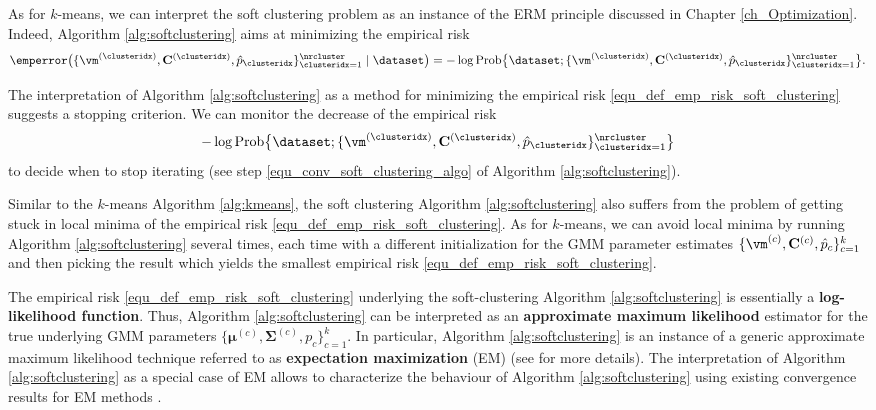 \documentclass[12pt]{report}
\begin{document}
As for $k$-means, we can interpret the soft clustering problem 
as an instance of the ERM principle discussed in Chapter \ref{ch_Optimization}. 
Indeed, Algorithm \ref{alg:softclustering} aims at minimizing the 
empirical risk 
\begin{equation} 
\label{equ_def_emp_risk_soft_clustering}
\emperror \big( \{ \vm^{(\clusteridx)}, \mathbf{C}^{(\clusteridx)}, \hat{p}_{\clusteridx} \}_{\clusteridx=1}^{\nrcluster} \mid \dataset \big)=
 - \log {\rm Prob} \big\{\dataset; \{ \vm^{(\clusteridx)}, \mathbf{C}^{(\clusteridx)}, \hat{p}_{\clusteridx} \}_{\clusteridx=1}^{\nrcluster}\big\}. 
\end{equation} 

The interpretation of Algorithm \ref{alg:softclustering} as a 
method for minimizing the empirical risk \eqref{equ_def_emp_risk_soft_clustering} 
suggests a stopping criterion. We can monitor the decrease of the empirical risk 
$$ - \log {\rm Prob} \big\{\dataset; \{ \vm^{(\clusteridx)}, \mathbf{C}^{(\clusteridx)}, \hat{p}_{\clusteridx} \}_{\clusteridx=1}^{\nrcluster}\big\}$$
to decide when to stop iterating (see step \ref{equ_conv_soft_clustering_algo} 
of Algorithm \ref{alg:softclustering}). %

Similar to the $k$-means Algorithm \ref{alg:kmeans}, the soft clustering Algorithm \ref{alg:softclustering} 
also suffers from the problem of getting stuck in local minima of the empirical risk \eqref{equ_def_emp_risk_soft_clustering}. 
As for $k$-means, we can avoid local minima by running Algorithm \ref{alg:softclustering} 
several times, each time with a different initialization for the GMM parameter 
estimates $ \{ \vm^{(c)}, \mathbf{C}^{(c)}, \hat{p}_{c} \}_{c=1}^{k}$ and then 
picking the result which yields the smallest empirical risk \eqref{equ_def_emp_risk_soft_clustering}.  

The empirical risk \eqref{equ_def_emp_risk_soft_clustering} underlying the 
soft-clustering Algorithm \ref{alg:softclustering} is essentially a {\bf log-likelihood function}. 
Thus, Algorithm \ref{alg:softclustering} can be interpreted as an {\bf approximate maximum 
likelihood} estimator for the true underlying GMM parameters $\{{\bm \mu}^{(c)},{\bm \Sigma}^{(c)},p_{c}\}_{c=1}^{k}$. 
In particular, Algorithm \ref{alg:softclustering} is an instance of a generic 
approximate maximum likelihood technique referred to as {\bf expectation maximization} 
(EM) (see \cite[Chap. 8.5]{hastie01statisticallearning} for more details). 
The interpretation of Algorithm \ref{alg:softclustering} as a special case of 
EM allows to characterize the behaviour of Algorithm \ref{alg:softclustering} 
using existing convergence results for EM methods \cite{XuJordan1996}. 
%
\end{document}
